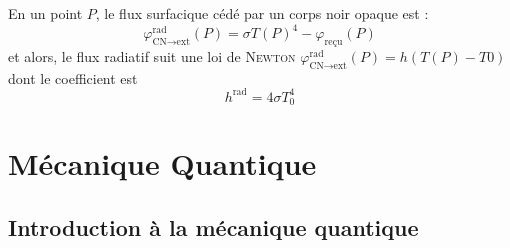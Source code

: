\documentclass[11pt,a4paper,fleqn,pdftex]{report}
\begin{document}
\begin{theorem}
En un point $P$, le flux surfacique cédé par un corps noir opaque est :
\begin{equation}
\varphi^{\text{rad}}_{\text{CN}\to \text{ext}} (P)=\sigma T(P)^4 - \varphi_{\text{reçu}} (P)
\end{equation}
et alors, le flux radiatif suit une loi de \textsc{Newton} $\varphi^{\text{rad}}_{\text{CN}\to \text{ext}} (P)=h(T(P) - T0)$ dont le coefficient est 
\begin{equation}
h^\text{rad} = 4\sigma T_0^4
\end{equation}
\end{theorem}
\chapter{Mécanique Quantique} %
\label{cha:mecanique_quantique}
\section{Introduction à la mécanique quantique} %
\label{sec:introduction_la_mecanique_quantique}
\end{document}
